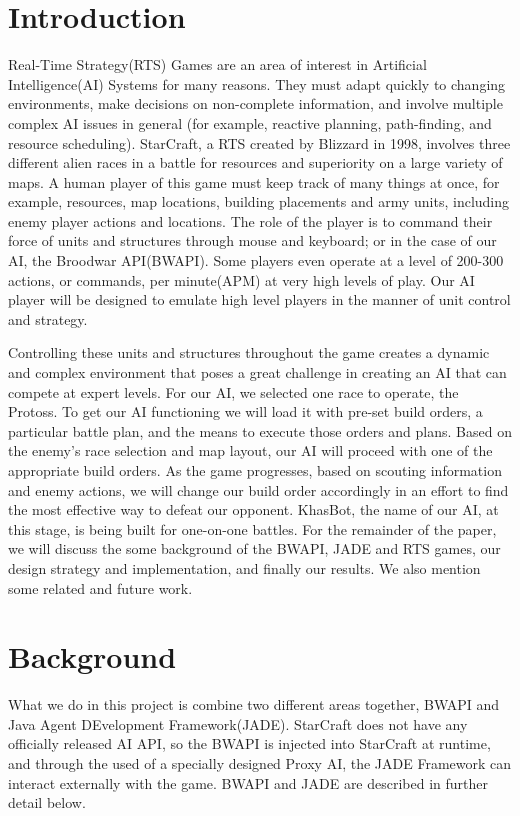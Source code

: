 \documentclass[letterpaper]{article}
\begin{document}
\section{Introduction}
Real-Time Strategy(RTS) Games are an area of interest in Artificial Intelligence(AI) Systems for many reasons.  They must adapt quickly to changing environments, make decisions on non-complete information, and involve multiple complex AI issues in general (for example, reactive planning, path-finding, and resource scheduling).  StarCraft, a RTS created by Blizzard in 1998, involves three different alien races in a battle for resources and superiority on a large variety of maps.  A human player of this game must keep track of many things at once, for example, resources, map locations, building placements and army units, including enemy player actions and locations.  The role of the player is to command their force of units and structures through mouse and keyboard; or in the case of our AI, the Broodwar API(BWAPI). Some players even operate at a level of 200-300 actions, or commands, per minute(APM) at very high levels of play. Our AI player will be designed to emulate high level players in the manner of unit control and strategy.

Controlling these units and structures throughout the game creates a dynamic and complex environment that poses a great challenge in creating an AI that can compete at expert levels.  For our AI, we selected one race to operate, the Protoss.  To get our AI functioning we will load it with pre-set build orders, a particular battle plan, and the means to execute those orders and plans.  Based on the enemy's race selection and map layout, our AI will proceed with one of the appropriate build orders.  As the game progresses, based on scouting information and enemy actions, we will change our build order accordingly in an effort to find the most effective way to defeat our opponent.  KhasBot, the name of our AI, at this stage, is being built for one-on-one battles.
For the remainder of the paper, we will discuss the some background of the BWAPI, JADE and RTS games, our design strategy and implementation, and finally our results.  We also mention some related and future work.

\section{Background}
What we do in this project is combine two different areas together, BWAPI  and Java Agent DEvelopment Framework(JADE).  StarCraft does not have any officially released AI API, so the BWAPI is injected into StarCraft at runtime, and through the used of a specially designed Proxy AI, the JADE Framework can interact externally with the game.  BWAPI and JADE are described in further detail below.
\end{document}
